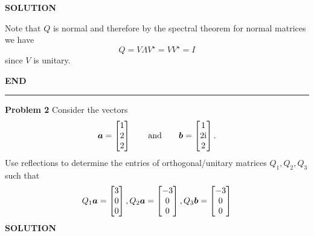 \documentclass[12pt,a4paper]{article}
\def\a{ {\vc a} }
\def\b{ {\vc b} }
\begin{document}
\textbf{SOLUTION}

Note that $Q$ is normal and therefore by the spectral theorem for  normal matrices we have
\[
Q = V \ensuremath{\Lambda} V^\ensuremath{\star} = V V^\ensuremath{\star} = I
\]
since $V$ is unitary. 

\textbf{END}

\rule{\textwidth}{1pt}
\textbf{Problem 2} Consider the vectors
\[
\ensuremath{\bm{\a}} = \begin{bmatrix} 1 \\ 2 \\ 2 \end{bmatrix}\qquad\hbox{and}\qquad  \ensuremath{\bm{\b}} = \begin{bmatrix} 1 \\ 2{\rm i} \\ 2 \end{bmatrix}.
\]
Use reflections to determine the entries of orthogonal/unitary matrices $Q_1, Q_2, Q_3$ such that
\[
Q_1 \ensuremath{\bm{\a}} = \begin{bmatrix} 3 \\ 0 \\ 0 \end{bmatrix}, Q_2 \ensuremath{\bm{\a}} = \begin{bmatrix} -3 \\ 0 \\ 0 \end{bmatrix},
Q_3 \ensuremath{\bm{\b}} = \begin{bmatrix} -3 \\ 0 \\ 0 \end{bmatrix}
\]
\textbf{SOLUTION}
\end{document}
